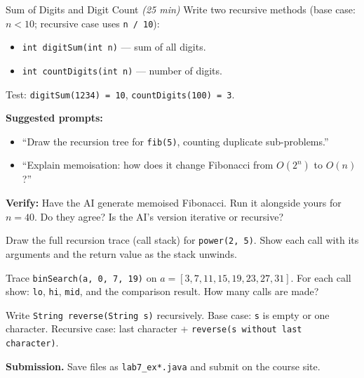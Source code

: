 \documentclass[11pt]{article}
\begin{document}
\begin{labexercise}{Sum of Digits and Digit Count \hfill {\small \itshape (25 min)}}
Write two recursive methods (base case: $n < 10$; recursive case uses \texttt{n / 10}):
\begin{itemize}[leftmargin=*,nosep]
  \item \texttt{int digitSum(int n)} --- sum of all digits.
  \item \texttt{int countDigits(int n)} --- number of digits.
\end{itemize}
Test: \texttt{digitSum(1234) = 10}, \texttt{countDigits(100) = 3}.
\end{labexercise}

\begin{aicollab}
\textbf{Suggested prompts:}
\begin{itemize}[leftmargin=*,nosep]
  \item ``Draw the recursion tree for \texttt{fib(5)}, counting duplicate sub-problems.''
  \item ``Explain memoisation: how does it change Fibonacci from $O(2^n)$ to $O(n)$?''
\end{itemize}
\medskip\textbf{Verify:} Have the AI generate memoised Fibonacci. Run it alongside yours for $n=40$.
Do they agree? Is the AI's version iterative or recursive?
\end{aicollab}

\takehomebanner

\begin{trace}
Draw the full recursion trace (call stack) for \texttt{power(2, 5)}.
Show each call with its arguments and the return value as the stack unwinds.
\end{trace}

\begin{trace}
Trace \texttt{binSearch(a, 0, 7, 19)} on $a = [3, 7, 11, 15, 19, 23, 27, 31]$.
For each call show: \texttt{lo}, \texttt{hi}, \texttt{mid}, and the comparison result.
How many calls are made?
\end{trace}

\begin{writecode}
Write \texttt{String reverse(String s)} recursively.
Base case: \texttt{s} is empty or one character.
Recursive case: last character + \texttt{reverse(s without last character)}.
\end{writecode}

\vspace{4pt}
\noindent\textbf{Submission.} Save files as \texttt{lab7\_ex*.java} and submit on the course site.
\end{document}
